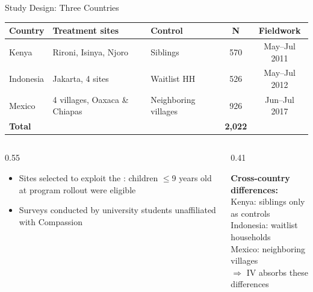 \documentclass[aspectratio=169, 10pt]{beamer}
\begin{document}
\begin{frame}{Study Design: Three Countries}
  \begin{center}
  \small
  \begin{tabular}{lp{3.8cm}p{2.4cm}cc}
    \toprule
    \textbf{Country} & \textbf{Treatment sites} & \textbf{Control} & \textbf{N} & \textbf{Fieldwork} \\
    \midrule
    Kenya     & Rironi, Isinya, Njoro                & Siblings            & 570  & May--Jul 2011 \\
    Indonesia & Jakarta, 4 sites                    & Waitlist HH         & 526  & May--Jul 2012 \\
    Mexico    & 4 villages, Oaxaca \& Chiapas        & Neighboring villages & 926 & Jun--Jul 2017 \\
    \midrule
    \textbf{Total} & & & \textbf{2,022} & \\
    \bottomrule
  \end{tabular}
  \end{center}
  \vspace{0.5em}
  \begin{columns}
    \begin{column}{0.55\textwidth}
      \begin{itemize}
        \item Sites selected to exploit the : children $\leq$9 years old at program rollout were eligible
        \item Surveys conducted by university students unaffiliated with Compassion
      \end{itemize}
    \end{column}
    \begin{column}{0.41\textwidth}
      \begin{methodbox}
        \textbf{Cross-country differences:}\\[0.3em]
        Kenya: siblings only as controls\\
        Indonesia: waitlist households\\
        Mexico: neighboring villages\\[0.3em]
        $\Rightarrow$ IV absorbs these differences
      \end{methodbox}
    \end{column}
  \end{columns}
\end{frame}
\end{document}
